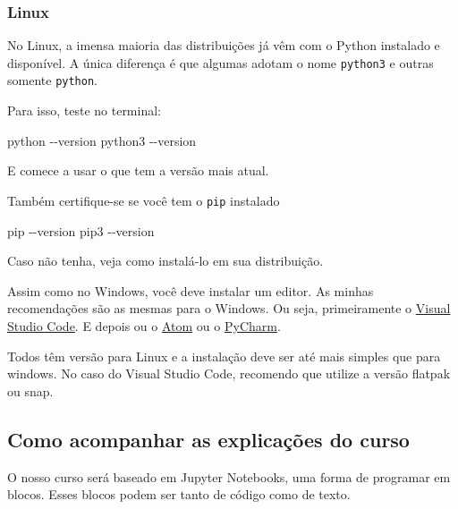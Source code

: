 \documentclass[11pt, brazilian]{article}
\newenvironment{Shaded}{}{}
\newcommand{\ExtensionTok}[1]{{#1}}
\newcommand{\AttributeTok}[1]{\textcolor[rgb]{0.49,0.56,0.16}{{#1}}}
\begin{document}
\hypertarget{linux-1}{%
\subsubsection{Linux}\label{linux-1}}

No Linux, a imensa maioria das distribuições já vêm com o Python
instalado e disponível. A única diferença é que algumas adotam o nome
\texttt{python3} e outras somente \texttt{python}.

Para isso, teste no terminal:

\begin{Shaded}
\begin{Highlighting}[]
\ExtensionTok{python} \AttributeTok{{-}{-}version}
\ExtensionTok{python3} \AttributeTok{{-}{-}version}
\end{Highlighting}
\end{Shaded}

E comece a usar o que tem a versão mais atual.

Também certifique-se se você tem o \texttt{pip} instalado

\begin{Shaded}
\begin{Highlighting}[]
\ExtensionTok{pip} \AttributeTok{{-}{-}version}
\ExtensionTok{pip3} \AttributeTok{{-}{-}version}
\end{Highlighting}
\end{Shaded}

Caso não tenha, veja como instalá-lo em sua distribuição.

Assim como no Windows, você deve instalar um editor. As minhas
recomendações são as mesmas para o Windows. Ou seja, primeiramente o
\href{https://code.visualstudio.com/}{Visual Studio Code}. E depois ou o
\href{https://atom.io/}{Atom} ou o
\href{https://www.jetbrains.com/pt-br/pycharm/download/}{PyCharm}.

Todos têm versão para Linux e a instalação deve ser até mais simples que
para windows. No caso do Visual Studio Code, recomendo que utilize a
versão flatpak ou snap.

\hypertarget{como-acompanhar-as-explicauxe7uxf5es-do-curso}{%
\subsection{Como acompanhar as explicações do
curso}\label{como-acompanhar-as-explicauxe7uxf5es-do-curso}}

O nosso curso será baseado em Jupyter Notebooks, uma forma de programar
em blocos. Esses blocos podem ser tanto de código como de texto.
\end{document}
